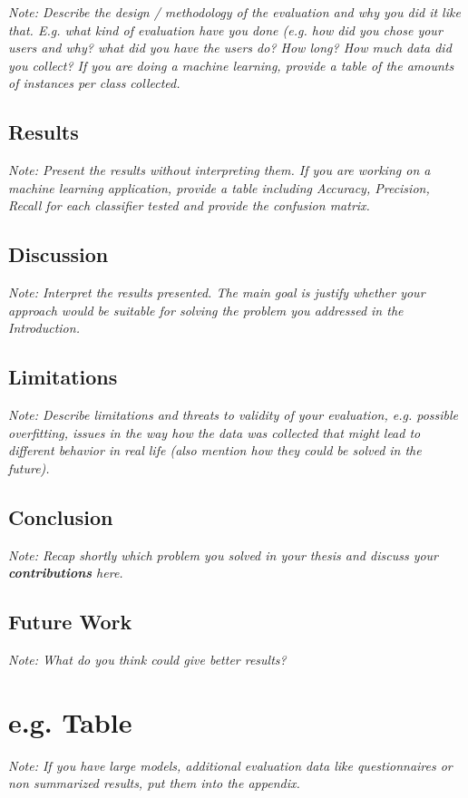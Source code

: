 \documentclass[a4paper,12pt,twoside]{report}
\begin{document}
\textit{Note: Describe the design / methodology of the evaluation and why you did it like that. E.g. what kind of evaluation have you done (e.g. how did you chose your users and why? what did you have the users do? How long? How much data did you collect? If you are doing a machine learning, provide a table of the amounts of instances per class collected.}

\section{Results}

\textit{Note: Present the results without interpreting them. If you are working on a machine learning application, provide a table including Accuracy, Precision, Recall for each classifier tested and provide the confusion matrix.}

\section{Discussion}

\textit{Note: Interpret the results presented. The main goal is justify whether your approach would be suitable for solving the problem you addressed in the Introduction.}

\section{Limitations}

\textit{Note: Describe limitations and threats to validity of your evaluation, e.g. possible overfitting, issues in the way how the data was collected that might lead to different behavior in real life (also mention how they could be solved in the future).}




\section{Conclusion}

\textit{Note: Recap shortly which problem you solved in your thesis and discuss your \textbf{contributions} here.}

\section{Future Work}

\textit{Note: What do you think could give better results?}


\appendix

\chapter{e.g. Table}

\textit{Note: If you have large models, additional evaluation data like questionnaires or non summarized results, put them into the appendix.}


\clearpage

\listoffigures
\clearpage

\listoftables
\clearpage



\end{document}

